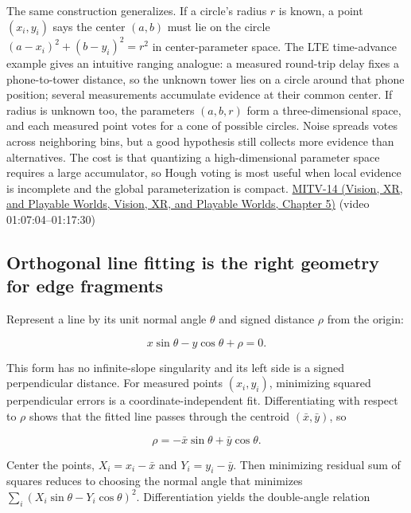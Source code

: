 The same construction generalizes. If a circle's radius \(r\) is known, a point \((x_i,y_i)\) says the center \((a,b)\) must lie on the circle \((a-x_i)^2+(b-y_i)^2=r^2\) in center-parameter space. The LTE time-advance example gives an intuitive ranging analogue: a measured round-trip delay fixes a phone-to-tower distance, so the unknown tower lies on a circle around that phone position; several measurements accumulate evidence at their common center. If radius is unknown too, the parameters \((a,b,r)\) form a three-dimensional space, and each measured point votes for a cone of possible circles. Noise spreads votes across neighboring bins, but a good hypothesis still collects more evidence than alternatives. The cost is that quantizing a high-dimensional parameter space requires a large accumulator, so Hough voting is most useful when local evidence is incomplete and the global parameterization is compact. \href{../07-Vision-XR-and-Playable-Worlds/main.pdf\#nameddest=04-visual-computing-ii-ch036-mitv-14---inspection-in-patquick-hough-transform-homography-position-determination-multi-scale}{MITV-14 (Vision, XR, and Playable Worlds, Vision, XR, and Playable Worlds, Chapter 5)} (video 01:07:04--01:17:30)

\subsection{Orthogonal line fitting is the right geometry for edge fragments}\label{04-visual-computing-ii-ch030-orthogonal-line-fitting-is-the-right-geometry-for-edge-fragments}

Represent a line by its unit normal angle \(\theta\) and signed distance \(\rho\) from the origin:

\[
x\sin\theta-y\cos\theta+\rho=0.
\]

This form has no infinite-slope singularity and its left side is a signed perpendicular distance. For measured points \((x_i,y_i)\), minimizing squared perpendicular errors is a coordinate-independent fit. Differentiating with respect to \(\rho\) shows that the fitted line passes through the centroid \((\bar x,\bar y)\), so

\[
\rho=-\bar x\sin\theta+\bar y\cos\theta.
\]

Center the points, \(X_i=x_i-\bar x\) and \(Y_i=y_i-\bar y\). Then minimizing residual sum of squares reduces to choosing the normal angle that minimizes \(\sum_i(X_i\sin\theta-Y_i\cos\theta)^2\). Differentiation yields the double-angle relation

